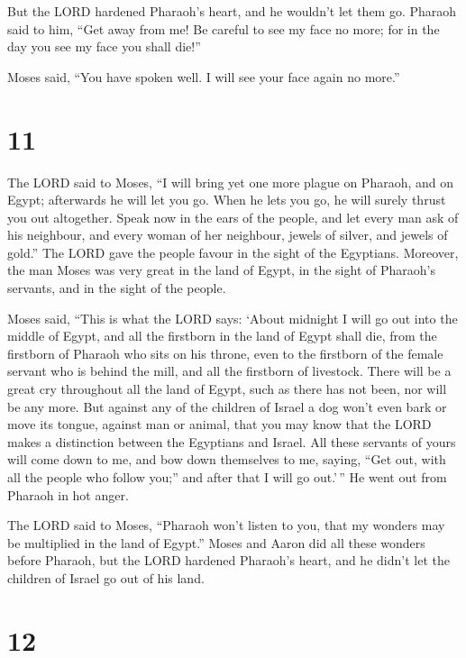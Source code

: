  But the LORD hardened Pharaoh's heart, and he wouldn't let
them go.  Pharaoh said to him, ``Get away from me! Be
careful to see my face no more; for in the day you see my face you shall
die!''

 Moses said, ``You have spoken well. I will see your face
again no more.''

\hypertarget{section-10}{%
\section{11}\label{section-10}}

 The LORD said to Moses, ``I will bring yet one more plague
on Pharaoh, and on Egypt; afterwards he will let you go. When he lets
you go, he will surely thrust you out altogether.  Speak now
in the ears of the people, and let every man ask of his neighbour, and
every woman of her neighbour, jewels of silver, and jewels of gold.''
 The LORD gave the people favour in the sight of the
Egyptians. Moreover, the man Moses was very great in the land of Egypt,
in the sight of Pharaoh's servants, and in the sight of the people.

 Moses said, ``This is what the LORD says: `About midnight I
will go out into the middle of Egypt,  and all the firstborn
in the land of Egypt shall die, from the firstborn of Pharaoh who sits
on his throne, even to the firstborn of the female servant who is behind
the mill, and all the firstborn of livestock.  There will be
a great cry throughout all the land of Egypt, such as there has not
been, nor will be any more.  But against any of the children
of Israel a dog won't even bark or move its tongue, against man or
animal, that you may know that the LORD makes a distinction between the
Egyptians and Israel.  All these servants of yours will come
down to me, and bow down themselves to me, saying, ``Get out, with all
the people who follow you;'' and after that I will go out.'\,'' He went
out from Pharaoh in hot anger.

 The LORD said to Moses, ``Pharaoh won't listen to you, that
my wonders may be multiplied in the land of Egypt.''  Moses
and Aaron did all these wonders before Pharaoh, but the LORD hardened
Pharaoh's heart, and he didn't let the children of Israel go out of his
land.

\hypertarget{section-11}{%
\section{12}\label{section-11}}

